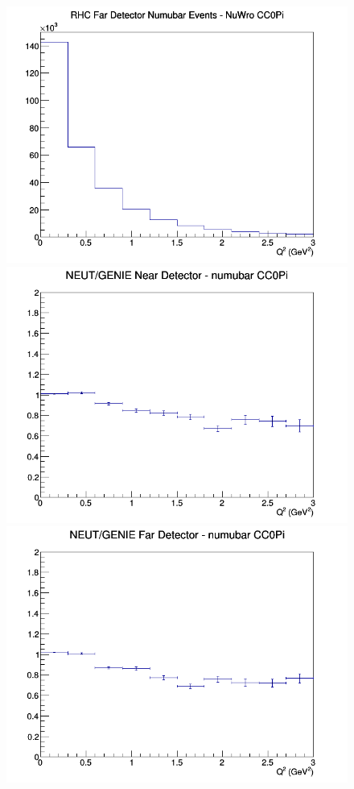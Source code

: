 \documentclass[12pt]{article}
\begin{document}
\begin{figure}[h]
\endminipage
{}
\includegraphics[width=\linewidth]{eff_Q2/LAr/CC0Pi_RHC_FD_numubar_Q2_NuWro.png}
\endminipage
\newline
{}
\includegraphics[width=\linewidth]{eff_Q2/LAr/ratios/CC0Pi_NEUT_GENIE_numubar_near_Q2.png}
\endminipage
{}
\includegraphics[width=\linewidth]{eff_Q2/LAr/ratios/CC0Pi_NEUT_GENIE_numubar_far_Q2.png}

\end{figure}
\end{document}
